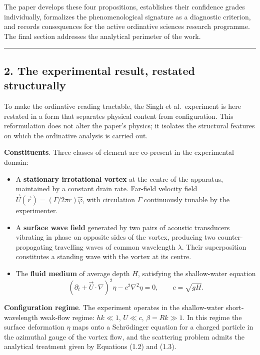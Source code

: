 \documentclass[
  11pt,
  a4paper,
]{article}
\providecommand{\tightlist}{%
  \setlength{\itemsep}{0pt}\setlength{\parskip}{0pt}}
\begin{document}
The paper develops these four propositions, establishes their confidence
grades individually, formalizes the phenomenological signature as a
diagnostic criterion, and records consequences for the active ordinative
sciences research programme. The final section addresses the analytical
perimeter of the work.

\begin{center}\rule{0.5\linewidth}{0.5pt}\end{center}

\subsection{2. The experimental result, restated
structurally}\label{the-experimental-result-restated-structurally}

To make the ordinative reading tractable, the Singh et al.~experiment is
here restated in a form that separates physical content from
configuration. This reformulation does not alter the paper's physics; it
isolates the structural features on which the ordinative analysis is
carried out.

\textbf{Constituents}. Three classes of element are co-present in the
experimental domain:

\begin{itemize}
\tightlist
\item
  A \textbf{stationary irrotational vortex} at the centre of the
  apparatus, maintained by a constant drain rate. Far-field velocity
  field \(\vec U(\vec r) = (\Gamma / 2\pi r)\hat\varphi\), with
  circulation \(\Gamma\) continuously tunable by the experimenter.
\item
  A \textbf{surface wave field} generated by two pairs of acoustic
  transducers vibrating in phase on opposite sides of the vortex,
  producing two counter-propagating travelling waves of common
  wavelength \(\lambda\). Their superposition constitutes a standing
  wave with the vortex at its centre.
\item
  The \textbf{fluid medium} of average depth \(H\), satisfying the
  shallow-water equation
  \[ (\partial_t + \vec U\cdot\nabla)^2 \eta - c^2 \nabla^2\eta = 0, \qquad c = \sqrt{gH}. \tag{2.1} \]
\end{itemize}

\textbf{Configuration regime}. The experiment operates in the
shallow-water short-wavelength weak-flow regime: \(hk \ll 1\),
\(U \ll c\), \(\beta = Rk \gg 1\). In this regime the surface
deformation \(\eta\) maps onto a Schrödinger equation for a charged
particle in the azimuthal gauge of the vortex flow, and the scattering
problem admits the analytical treatment given by Equations (1.2) and
(1.3).
\end{document}
